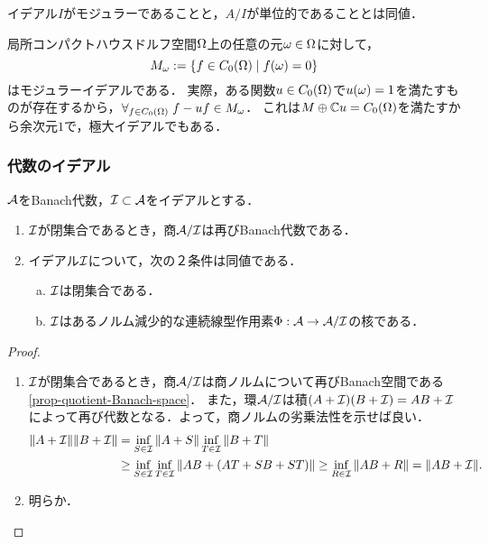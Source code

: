 \documentclass[uplatex,dvipdfmx]{jsreport}
\begin{document}
\begin{lemma}[modular性の特徴付け]
    イデアル$I$がモジュラーであることと，$A/I$が単位的であることとは同値．
\end{lemma}

\begin{example}
    局所コンパクトハウスドルフ空間$\Omega$上の任意の元$\omega\in\Omega$に対して，
    \[M_\omega:=\left\{f\in C_0(\Omega)\mid f(\omega)=0\right\}\]
    はモジュラーイデアルである．
    実際，ある関数$u\in C_0(\Omega)$で$u(\omega)=1$を満たすものが存在するから，$\forall_{f\in C_0(\Omega)}\;f-uf\in M_\omega$．
    これは$M\oplus \mathbb{C} u=C_0(\Omega)$を満たすから余次元$1$で，極大イデアルでもある．
\end{example}

\subsubsection{代数のイデアル}

\begin{lemma}[quotient]\label{lemma-quotient-of-Banach-algebra}
    $\mathcal{A}$をBanach代数，$\mathcal{I}\subset \mathcal{A}$をイデアルとする．
    \begin{enumerate}
        \item $\mathcal{I}$が閉集合であるとき，商$\mathcal{A}/\mathcal{I}$は再びBanach代数である．
        \item イデアル$\mathcal{I}$について，次の２条件は同値である．
        \begin{enumerate}[(a)]
            \item $\mathcal{I}$は閉集合である．
            \item $\mathcal{I}$はあるノルム減少的な連続線型作用素$\Phi:\mathcal{A}\to \mathcal{A}/\mathcal{I}$の核である．
        \end{enumerate}
    \end{enumerate}
\end{lemma}
\begin{proof}\mbox{}
    \begin{enumerate}
        \item $\mathcal{I}$が閉集合であるとき，商$\mathcal{A}/\mathcal{I}$は商ノルムについて再びBanach空間である\ref{prop-quotient-Banach-space}．
        また，環$\mathcal{A}/\mathcal{I}$は積$(A+\mathcal{I})(B+\mathcal{I})=AB+\mathcal{I}$によって再び代数となる．よって，商ノルムの劣乗法性を示せば良い．
        \begin{align*}
            \|A+\mathcal{I}\|\|B+\mathcal{I}\|&=\inf_{S\in\mathcal{I}}\|A+S\|\inf_{T\in\mathcal{I}}\|B+T\|\\
            &\ge\inf_{S\in\mathcal{I}}\inf_{T\in\mathcal{I}}\|AB+(AT+SB+ST)\|\ge\inf_{R\in\mathcal{I}}\|AB+R\|=\|AB+\mathcal{I}\|.
        \end{align*}
        \item 明らか．
    \end{enumerate}
\end{proof}
\end{document}
